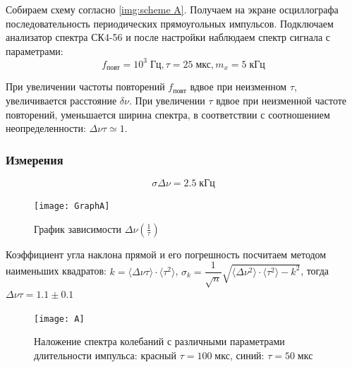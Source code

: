 \documentclass[a4paper, 12pt]{article}
\begin{document}
Собираем схему согласно \ref{img:scheme A}. Получаем на экране осциллографа последовательность периодических прямоугольных импульсов. Подключаем анализатор спектра СК4-56 и после настройки наблюдаем спектр сигнала с параметрами: $$f_\text{повт} = 10^3 \; \text{Гц}, \tau = 25 \; \text{мкс}, m_x = 5 \; \text{кГц}$$

При увеличении частоты повторений $f_\text{повт}$ вдвое при неизменном $\tau$, увеличивается расстояние $\delta \nu$. При увеличении $\tau$ вдвое при неизменной частоте повторений, уменьшается ширина спектра, в соответствии с соотношением неопределенности: $\Delta \nu \tau \simeq 1$.

\subsubsection*{Измерения}
$$\sigma \Delta \nu = 2.5 \; \text{кГц}$$
\begin{table}[H]
\centering
{}
\caption{Зависимость ширины $\Delta \nu$ спектра  от длительности импульса $\tau$}
\end{table}

\begin{figure}[H]
\centering
\texttt{[image: GraphA]}
\caption{График зависимости $\Delta \nu (\frac{1}{\tau})$}
\end{figure}

Коэффициент угла наклона прямой и его погрешность посчитаем методом наименьших квадратов: $k = \langle \Delta \nu \tau \rangle \cdot \langle \tau^2 \rangle$, $\sigma_k = \dfrac{1}{\sqrt{n}} \sqrt{\langle \Delta \nu^2 \rangle \cdot \langle \tau^2 \rangle - k^2}$, тогда $\Delta \nu \tau = 1.1 \pm 0.1$

\begin{figure}[H]
\centering
\texttt{[image: A]}
\caption{Наложение спектра колебаний с различными параметрами длительности импульса: красный $\tau = 100 \; \text{мкс}$, синий: $\tau = 50 \; \text{мкс}$}
\end{figure}
\end{document}
